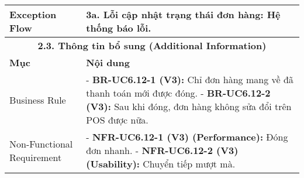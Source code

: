 \begin{longtable}{|m{4cm}|p{11cm}|}
\hline
Exception Flow & \textbf{3a. Lỗi cập nhật trạng thái đơn hàng:} Hệ thống báo lỗi. \\
\hline
\multicolumn{2}{|c|}{\textbf{2.3. Thông tin bổ sung (Additional Information)}} \\
\hline
\textbf{Mục} & \textbf{Nội dung} \\
\hline
Business Rule & - \textbf{BR-UC6.12-1 (V3):} Chỉ đơn hàng mang về đã thanh toán mới được đóng. \newline - \textbf{BR-UC6.12-2 (V3):} Sau khi đóng, đơn hàng không sửa đổi trên POS được nữa. \\
\hline
Non-Functional Requirement & - \textbf{NFR-UC6.12-1 (V3) (Performance):} Đóng đơn nhanh. \newline - \textbf{NFR-UC6.12-2 (V3) (Usability):} Chuyển tiếp mượt mà. \\
\hline
\end{longtable}

